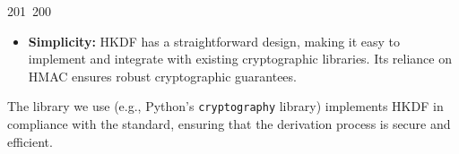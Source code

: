 201~200~\documentclass{article}
\begin{document}
\begin{itemize}
	                                                                                                                                                                                                                                                                                                	                                                                                                                                        	    	                                                                                                	                                                                                                                                                                                                                                                                        \item \textbf{Simplicity:} HKDF has a straightforward design, making it easy to implement and integrate with existing cryptographic libraries. Its reliance on HMAC ensures robust cryptographic guarantees.
	                                                                                                                                                                                                                                                                                                	                                                                                                                                        	    	                                                                                                	                                                                                                                                                                                                                                                                        \end{itemize}

	                                                                                                                                                                                                                                                                                                	                                                                                                                                        	    	                                                                                                	                                                                                                                                                                                                                                                                        The library we use (e.g., Python's \texttt{cryptography} library) implements HKDF in compliance with the standard, ensuring that the derivation process is secure and efficient.
\end{document}
